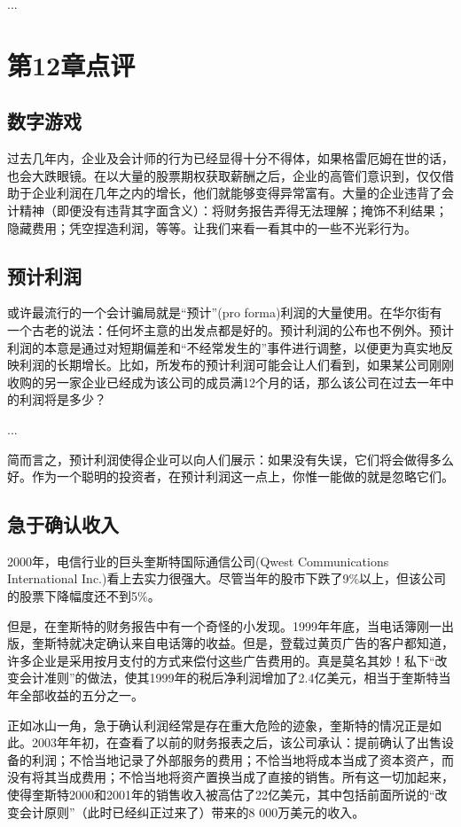 \documentclass[12pt,oneside]{book}
\begin{document}
...



\section{第12章点评}
\subsection{数字游戏}
过去几年内，企业及会计师的行为已经显得十分不得体，如果格雷厄姆在世的话，也会大跌眼镜。在以大量的股票期权获取薪酬之后，企业的高管们意识到，仅仅借助于企业利润在几年之内的增长，他们就能够变得异常富有。大量的企业违背了会计精神（即便没有违背其字面含义）：将财务报告弄得无法理解；掩饰不利结果；隐藏费用；凭空捏造利润，等等。让我们来看一看其中的一些不光彩行为。

\subsection{预计利润}
或许最流行的一个会计骗局就是“预计”(pro forma)利润的大量使用。在华尔街有一个古老的说法：任何坏主意的出发点都是好的。预计利润的公布也不例外。预计利润的本意是通过对短期偏差和“不经常发生的”事件进行调整，以便更为真实地反映利润的长期增长。比如，所发布的预计利润可能会让人们看到，如果某公司刚刚收购的另一家企业已经成为该公司的成员满12个月的话，那么该公司在过去一年中的利润将是多少？

...

简而言之，预计利润使得企业可以向人们展示：如果没有失误，它们将会做得多么好。作为一个聪明的投资者，在预计利润这一点上，你惟一能做的就是忽略它们。

\subsection{急于确认收入}
2000年，电信行业的巨头奎斯特国际通信公司(Qwest Communications International Inc.)看上去实力很强大。尽管当年的股市下跌了9\%以上，但该公司的股票下降幅度还不到5\%。

但是，在奎斯特的财务报告中有一个奇怪的小发现。1999年年底，当电话簿刚一出版，奎斯特就决定确认来自电话簿的收益。但是，登载过黄页广告的客户都知道，许多企业是采用按月支付的方式来偿付这些广告费用的。真是莫名其妙！私下“改变会计准则”的做法，使其1999年的税后净利润增加了2.4亿美元，相当于奎斯特当年全部收益的五分之一。

正如冰山一角，急于确认利润经常是存在重大危险的迹象，奎斯特的情况正是如此。2003年年初，在查看了以前的财务报表之后，该公司承认：提前确认了出售设备的利润；不恰当地记录了外部服务的费用；不恰当地将成本当成了资本资产，而没有将其当成费用；不恰当地将资产置换当成了直接的销售。所有这一切加起来，使得奎斯特2000和2001年的销售收入被高估了22亿美元，其中包括前面所说的“改变会计原则”（此时已经纠正过来了）带来的8 000万美元的收入。
\end{document}
